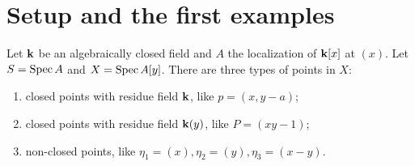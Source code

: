 \section{Setup and the first examples}

\begin{example}
    Let $\mathbf{k}$ be an algebraically closed field and $A$ the localization of $\mathbf{k}[x]$ at $(x)$.
    Let $S = \operatorname{Spec} A$ and $X = \operatorname{Spec} A[y]$. 
    There are three types of points in $X$:
    \begin{enumerate}[label=(\roman*)]
        \item closed points with residue field $\mathbf{k}$, like $p = (x,y-a)$;
        \item closed points with residue field $\mathbf{k}(y)$, like $P = (xy-1)$;
        \item non-closed points, like $\eta_1 = (x),\eta_2 = (y),\eta_3 = (x-y)$.
    \end{enumerate}

\end{example}
